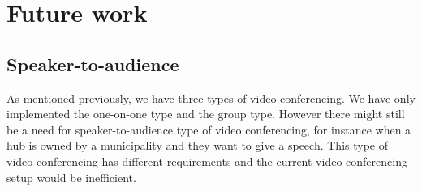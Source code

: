 \documentclass{report}
\begin{document}


\chapter{Future work}
\section{Speaker-to-audience}
As mentioned previously, we have three types of video conferencing. We have only implemented the one-on-one type and
the group type. However there might still be a need for speaker-to-audience type of video conferencing, for instance
when a hub is owned by a municipality and they want to give a speech. This type of video conferencing has different
requirements and the current video conferencing setup would be inefficient.

\newpage


\end{document}

